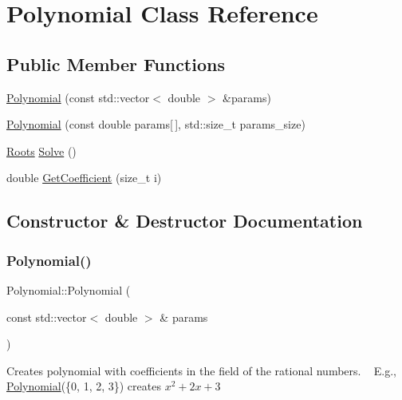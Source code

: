 \hypertarget{class_polynomial}{}\section{Polynomial Class Reference}
\label{class_polynomial}
\subsection*{Public Member Functions}
\begin{DoxyCompactItemize}
\item 
\mbox{\hyperlink{class_polynomial_a4884391c3366097d44556691daa3f942}{Polynomial}} (const std\+::vector$<$ double $>$ \&params)
\item 
\mbox{\hyperlink{class_polynomial_a0e0ad9a369edaaae98750da039cbde35}{Polynomial}} (const double params\mbox{[}$\,$\mbox{]}, std\+::size\+\_\+t params\+\_\+size)
\item 
\mbox{\hyperlink{struct_roots}{Roots}} \mbox{\hyperlink{class_polynomial_ac1a8732edb10e52f5ff4bba6aee83593}{Solve}} ()
\item 
double \mbox{\hyperlink{class_polynomial_a18791d35ed881e3f71e40d74f0d62a46}{Get\+Coefficient}} (size\+\_\+t i)
\end{DoxyCompactItemize}


\subsection{Constructor \& Destructor Documentation}
\mbox{\label{class_polynomial_a4884391c3366097d44556691daa3f942}} 
\subsubsection{\texorpdfstring{Polynomial()}{Polynomial()}\hspace{0.1cm}{\footnotesize\ttfamily [1/2]}}
{\footnotesize\ttfamily Polynomial\+::\+Polynomial (\begin{DoxyParamCaption}\item[{const std\+::vector$<$ double $>$ \&}]{params }\end{DoxyParamCaption})\hspace{0.3cm}{\ttfamily [explicit]}}

Creates polynomial with coefficients in the field of the rational numbers. ~\newline
 E.\+g., \mbox{\hyperlink{class_polynomial}{Polynomial}}(\{0, 1, 2, 3\}) creates $ x^2 + 2x + 3 $


